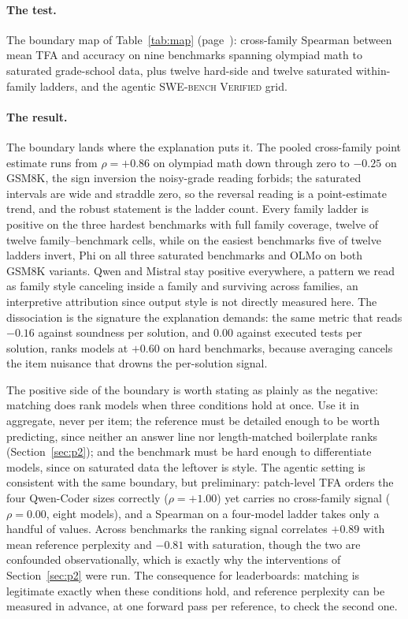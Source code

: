 \documentclass[11pt]{article}
\newcommand{\tfa}{\textsc{TFA}}
\begin{document}
\paragraph{The test.}
The boundary map of Table~\ref{tab:map} (page~\pageref{tab:map}): cross-family Spearman between mean \tfa{} and accuracy on nine benchmarks spanning olympiad math to saturated grade-school data, plus twelve hard-side and twelve saturated within-family ladders, and the agentic \textsc{SWE-bench Verified} grid.

\paragraph{The result.}
The boundary lands where the explanation puts it.
The pooled cross-family point estimate runs from $\rho = +0.86$ on olympiad math down through zero to $-0.25$ on \textsc{GSM8K}, the sign inversion the noisy-grade reading forbids; the saturated intervals are wide and straddle zero, so the reversal reading is a point-estimate trend, and the robust statement is the ladder count.
Every family ladder is positive on the three hardest benchmarks with full family coverage, twelve of twelve family--benchmark cells, while on the easiest benchmarks five of twelve ladders invert, Phi on all three saturated benchmarks and OLMo on both \textsc{GSM8K} variants.
Qwen and Mistral stay positive everywhere, a pattern we read as family style canceling inside a family and surviving across families, an interpretive attribution since output style is not directly measured here.
The dissociation is the signature the explanation demands: the same metric that reads $-0.16$ against soundness per solution, and $0.00$ against executed tests per solution, ranks models at $+0.60$ on hard benchmarks, because averaging cancels the item nuisance that drowns the per-solution signal.

The positive side of the boundary is worth stating as plainly as the negative: matching does rank models when three conditions hold at once.
Use it in aggregate, never per item; the reference must be detailed enough to be worth predicting, since neither an answer line nor length-matched boilerplate ranks (Section~\ref{sec:p2}); and the benchmark must be hard enough to differentiate models, since on saturated data the leftover is style.
The agentic setting is consistent with the same boundary, but preliminary: patch-level \tfa{} orders the four Qwen-Coder sizes correctly ($\rho = +1.00$) yet carries no cross-family signal ($\rho = 0.00$, eight models), and a Spearman on a four-model ladder takes only a handful of values.
Across benchmarks the ranking signal correlates $+0.89$ with mean reference perplexity and $-0.81$ with saturation, though the two are confounded observationally, which is exactly why the interventions of Section~\ref{sec:p2} were run.
The consequence for leaderboards: matching is legitimate exactly when these conditions hold, and reference perplexity can be measured in advance, at one forward pass per reference, to check the second one.
\end{document}
